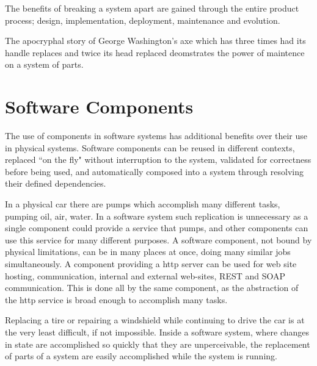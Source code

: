 \documentclass[a4paper]{report}
\begin{document}
The benefits of breaking a system apart are gained through the entire product process; design, implementation, deployment, maintenance and evolution.



The apocryphal story of George Washington's axe which has three times had its handle replaces and twice its head replaced deomstrates the power of maintence on a system of parts.


\section{Software Components}
{}The use of components in software systems has additional benefits over their use in physical systems.
{}Software components can be reused in different contexts, replaced ``on the fly" without interruption to the system, validated for correctness before being used, 
{}and automatically composed into a system through resolving their defined dependencies.

In a physical car there are pumps which accomplish many different tasks, pumping oil, air, water.
In a software system such replication is unnecessary as a single component could provide a service that pumps, 
and other components can use this service for many different purposes.
A software component, not bound by physical limitations, can be in many places at once, doing many similar jobs simultaneously.
A component providing a http server can be used for web site hosting, communication, internal and external web-sites, REST and SOAP communication.
This is done all by the same component, as the abstraction of the http service is broad enough to accomplish many tasks.

Replacing a tire or repairing a windshield while continuing to drive the car is at the very least difficult, if not impossible.
Inside a software system, where changes in state are accomplished so quickly that they are unperceivable, the replacement of parts of a system are easily accomplished while the system is running.
\end{document}
